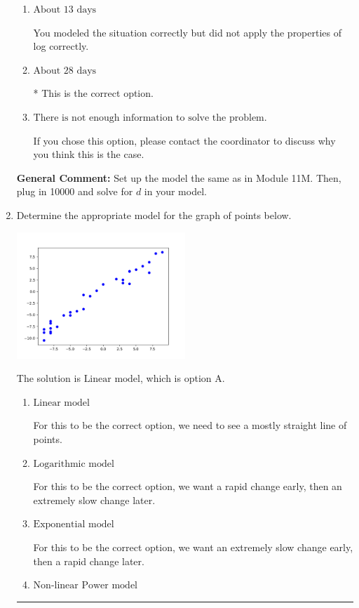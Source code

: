 \documentclass{extbook}[14pt]
\newcommand{\litem}[1]{\item #1

\rule{\textwidth}{0.4pt}}
\begin{document}
\begin{enumerate}
{\begin{enumerate}[label=\Alph*.]
You modeled the situation with $e$ as the base, but solved correctly otherwise.
\item \( \text{About } 13 \text{ days} \)

You modeled the situation correctly but did not apply the properties of log correctly.
\item \( \text{About } 28 \text{ days} \)

* This is the correct option.
\item \( \text{There is not enough information to solve the problem.} \)

If you chose this option, please contact the coordinator to discuss why you think this is the case.
\end{enumerate}

\textbf{General Comment:} Set up the model the same as in Module 11M. Then, plug in 10000 and solve for $d$ in your model.
}
\litem{
Determine the appropriate model for the graph of points below.

\begin{center}
    \includegraphics[width=0.5\textwidth]{../Figures/identifyModelGraph12CopyC.png}
\end{center}


The solution is \( \text{Linear model} \), which is option A.\begin{enumerate}[label=\Alph*.]
\item \( \text{Linear model} \)

For this to be the correct option, we need to see a mostly straight line of points.
\item \( \text{Logarithmic model} \)

For this to be the correct option, we want a rapid change early, then an extremely slow change later.
\item \( \text{Exponential model} \)

For this to be the correct option, we want an extremely slow change early, then a rapid change later.
\item \( \text{Non-linear Power model} \)


\end{enumerate}}
\end{enumerate}
\end{document}
